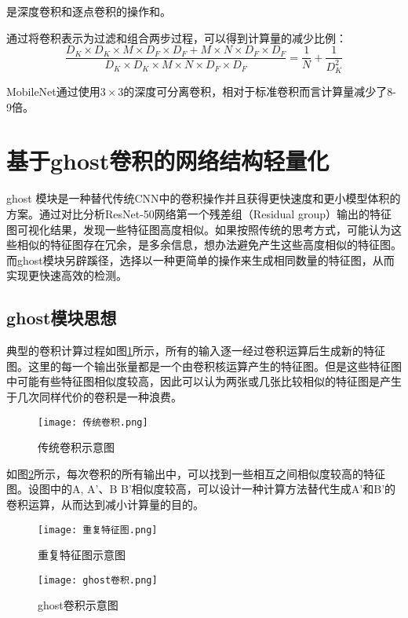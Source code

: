是深度卷积和逐点卷积的操作和。

通过将卷积表示为过滤和组合两步过程，可以得到计算量的减少比例：
\begin{equation}
    \frac{D_{K} \times D_{K} \times M \times D_{F} \times D_{F}+M \times N \times D_{F} \times D_{F}}{D_{K} \times D_{K} \times M \times N \times D_{F} \times D_{F}}=\frac{1}{N}+\frac{1}{D_{K}^{2}}
\end{equation}

MobileNet通过使用$3\times3$的深度可分离卷积，相对于标准卷积而言计算量减少了8-9倍。

\section{基于ghost卷积的网络结构轻量化}
ghost 模块是一种替代传统CNN中的卷积操作并且获得更快速度和更小模型体积的方案。通过对比分析ResNet-50网络第一个残差组（Residual group）输出的特征图可视化结果，发现一些特征图高度相似。如果按照传统的思考方式，可能认为这些相似的特征图存在冗余，是多余信息，想办法避免产生这些高度相似的特征图。而ghost模块另辟蹊径，选择以一种更简单的操作来生成相同数量的特征图，从而实现更快速高效的检测。

\subsection{ghost模块思想}
典型的卷积计算过程如图\ref{conv}所示，所有的输入逐一经过卷积运算后生成新的特征图。这里的每一个输出张量都是一个由卷积核运算产生的特征图。但是这些特征图中可能有些特征图相似度较高，因此可以认为两张或几张比较相似的特征图是产生于几次同样代价的卷积是一种浪费。

\begin{figure}[htbp]
    \centering
    \texttt{[image: 传统卷积.png]}
    \caption{传统卷积示意图}
    \label{conv}
\end{figure}

如图\ref{identical}所示，每次卷积的所有输出中，可以找到一些相互之间相似度较高的特征图。设图中的A, A’、B B’相似度较高，可以设计一种计算方法替代生成A’和B’的卷积运算，从而达到减小计算量的目的。

\begin{figure}[htbp]
    \centering
    \texttt{[image: 重复特征图.png]}
    \caption{重复特征图示意图}
    \label{identical}
\end{figure}

\begin{figure}[htbp]
    \centering
    \texttt{[image: ghost卷积.png]}
    \caption{ghost卷积示意图}
    \label{ghost1}
\end{figure}

